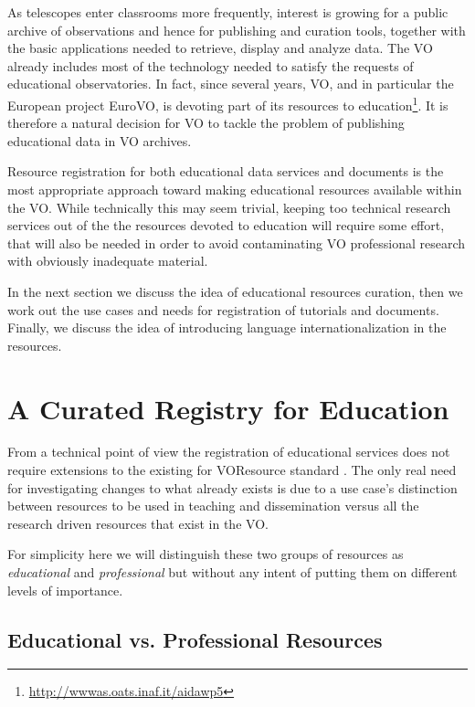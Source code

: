 \documentclass{ivoa}
\begin{document}
As telescopes enter classrooms more frequently, interest is growing for a 
public archive of observations and hence for publishing and curation tools, 
together with the basic applications needed to retrieve, display
and analyze data. The VO already includes most of the technology needed 
to satisfy the requests of educational observatories. In fact, since several 
years, VO, and in particular the European project EuroVO, is devoting part 
of its resources to
education\footnote{\url{http://wwwas.oats.inaf.it/aidawp5}}. It is 
therefore a natural decision for VO to tackle the problem of publishing 
educational data in VO archives.


Resource registration for both educational data services and documents 
is the most appropriate approach toward making educational resources 
available within the VO.  While
technically this may seem trivial, keeping too technical
research services out of the the resources devoted to education will
require some effort, that will also be needed in order to avoid contaminating 
VO professional research with obviously inadequate material.

In the next section we discuss the idea of educational resources curation, then 
we work out the use cases and needs for
registration of tutorials and documents. Finally, we discuss the idea of introducing language
internationalization in the resources.



\section{A Curated Registry for Education}

\label{sect:curreg}


From a technical point of view the registration of educational services
does not require extensions
to the existing for VOResource standard \citep{2008ivoa.spec.0222P}.
The only real need for investigating changes to what already exists is due to a
use case's distinction between resources to be used in teaching and dissemination
versus all the research driven resources that exist in the VO.



For simplicity here we will distinguish these two groups of resources as
\emph{educational}
 and 
\emph{professional}
 but without any intent of putting them
on different levels of importance.



\subsection{Educational vs. Professional Resources}
\end{document}
